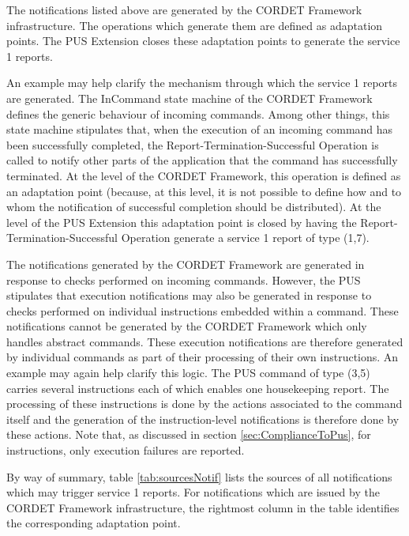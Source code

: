 \documentclass[a4paper,10pt]{article}
\begin{document}
The notifications listed above are generated by the CORDET Framework infrastructure. The operations which generate them are defined as adaptation points. The PUS Extension closes these adaptation points to generate the service 1 reports. 

An example may help clarify the mechanism through which the service 1 reports are generated. The InCommand state machine of the CORDET Framework defines the generic behaviour of incoming commands. Among other things, this state machine stipulates that, when the execution of an incoming command has been successfully completed, the Report-Termination-Successful Operation is called to notify other parts of the application that the command has successfully terminated. At the level of the CORDET Framework, this operation is defined as an adaptation point (because, at this level, it is not possible to define how and to whom the notification of successful completion should be distributed). At the level of the PUS Extension this adaptation point is closed by having the Report-Termination-Successful Operation generate a service 1 report of type (1,7).

The notifications generated by the CORDET Framework are generated in response to checks performed on incoming commands. However, the PUS stipulates that execution notifications may also be generated in response to checks performed on individual instructions embedded within a command. These notifications cannot be generated by the CORDET Framework which only handles abstract commands. These execution notifications are therefore generated by individual commands as part of their processing of their own instructions. An example may again help clarify this logic. The PUS command of type (3,5) carries several instructions each of which enables one housekeeping report. The processing of these instructions is done by the actions associated to the command itself and the generation of the instruction-level notifications is therefore done by these actions. Note that, as discussed in section \ref{sec:ComplianceToPus}, for instructions, only execution failures are reported.

By way of summary, table \ref{tab:sourcesNotif} lists the sources of all notifications which may trigger service 1 reports. For notifications which are issued by the CORDET Framework infrastructure, the rightmost column in the table identifies the corresponding adaptation point.
\end{document}
